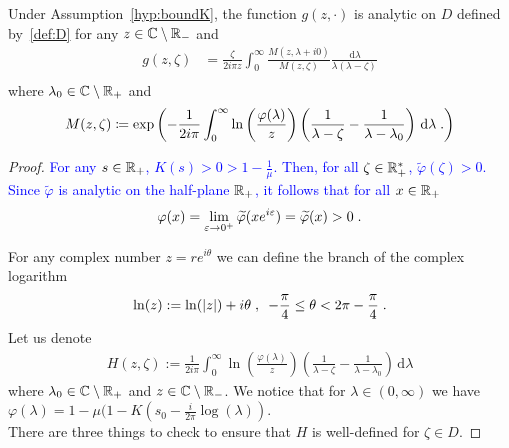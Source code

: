 \documentclass[11pt]{amsart}
\newcommand{\f}{\frac}
\newcommand{\blue}[1]{\textcolor{blue}{#1}}
\newcommand{\diff}{\,\mathrm{d}}
\begin{document}
\begin{theorem}
Under Assumption~\ref{hyp:boundK}, the function $g(z, \cdot)$ is analytic on $D$ defined by~\eqref{def:D} for any $z \in \mathbb{C} \setminus \mathbb{R}_-$ and
\begin{align*}
    g(z,\zeta) 
    &= 
    \frac{\zeta}{2i\pi z}\int_0^\infty  \frac{M(z,\lambda+i0)}{M(z,\zeta)} \frac{\diff \lambda}{\lambda(\lambda-\zeta)} \\
\end{align*}
where $\lambda_0 \in \mathbb{C} \setminus \mathbb{R}_+$ and 
$$ M(z, \zeta) \coloneqq \exp\left(-{\frac{1}{2i\pi  }\int_0^\infty \ln\left(\frac{\varphi(\lambda)}{z}\right) \left( \frac{1}{\lambda-\zeta} - \frac{1}{\lambda-\lambda_0}\right) \diff \lambda} \eqfinp\right)$$ 
\end{theorem}
\begin{proof}
\blue{For any $s \in \mathbb{R}_+$, $K(s) > 0 > 1 - \frac1\mu$. Then, 
for all $\zeta \in \mathbb{R}_+^*$, $\tilde \varphi(\zeta) > 0$.
Since $\tilde \varphi$ is analytic on the half-plane $\mathbb{R}_+$, it follows that for all $x \in \mathbb{R}_+$ 
    $$\varphi(x) = \lim_{\varepsilon \to 0^+} \widetilde \varphi(xe^{i\varepsilon}) = \widetilde \varphi(x) > 0 \; .$$
}

For any complex number $z = re^{i\theta}$ we can define the branch of the complex logarithm
\begin{equation}\label{def:log}
\ln(z) := \ln(|z|) + i\theta \; , \enspace -\frac{\pi}{4} \leq \theta < 2\pi - \frac{\pi}{4}  \; .
\end{equation}
Let us denote
    \begin{align}\label{def:H}
        H(z,\zeta) := \frac{1}{2i\pi }\int_0^\infty \ln\left(\frac{\varphi(\lambda)}{z}\right) \left( \frac{1}{\lambda-\zeta} - \frac{1}{\lambda-\lambda_0}\right) \diff \lambda
    \end{align}
where $\lambda_0 \in \mathbb{C} \setminus \mathbb{R}_+$ and \blue{$z \in \mathbb{C} \setminus \mathbb{R}_-$}. We notice that for $\lambda \in (0,\infty)$ we have $\varphi(\lambda)=1-\mu(1-K(s_0-\f{i}{2\pi} \log(\lambda))$.\\

There are three things to check to ensure that $H$ is well-defined for $\zeta \in D$. 


\end{proof}
\end{document}
